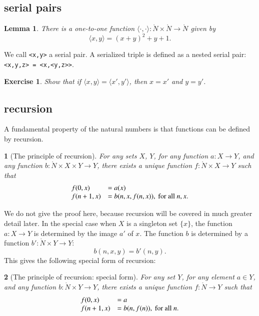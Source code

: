 \documentclass[cup9a]{cupbook}
\newtheorem{assert}{}[chapter]
\newtheorem{exer}{Exercise}[chapter]
\newtheorem{lemma}{Lemma}[chapter]
\begin{document}
\subsection{serial pairs}

\begin{lemma}
There is a one-to-one function $\langle\cdot,\cdot\rangle:\ring{N}\times\ring{N}\to\ring{N}$ given by
$$
\langle x,y\rangle = (x+y)^2 + y + 1.
$$
\end{lemma}
We call \verb!<x,y>! a serial pair. A serialized triple is defined as a nested serial pair: \verb!<x,y,z> = <x,<y,z>>!.

\begin{exer} Show that if $\langle x,y\rangle = \langle x',y'\rangle$, then $x=x'$ and $y=y'$.
\end{exer}



\subsection{recursion}

A fundamental property of the natural numbers is that functions can be
defined by recursion.


\begin{assert}[The principle of recursion]  For any sets $X$, $Y$, for any function $a:X\to Y$, and any function $b:\ring{N}\times X\times Y\to Y$, there exists a unique function $f:\ring{N}\times X\to Y$ such that
$$
\begin{array}{lll}
f(0,x) &= a(x)\\
f(n+1,x) &= b(n,x,f(n,x)),\hbox{ for all } n, x.
\end{array}
$$
\end{assert}

We do not give the proof here, because recursion will be covered in much greater detail later.  In the special case when $X$ is a singleton set $\{x\}$, the function $a:X\to Y$ is determined by the image $a'$ of $x$.  The function $b$ is determined by a function $b':\ring{N}\times Y\to Y$:
$$
b(n,x,y) = b'(n,y).
$$
This gives the following special form of recursion:

\begin{assert}[The principle of recursion: special form]  For any set $Y$, for any element $a\in Y$, and any function $b:\ring{N}\times Y\to Y$, there exists a unique function $f:\ring{N}\to Y$ such that
$$
\begin{array}{lll}
f(0,x) &= a\\
f(n+1,x) &= b(n,f(n)),\hbox{ for all } n.
\end{array}
$$
\end{assert}
\end{document}

